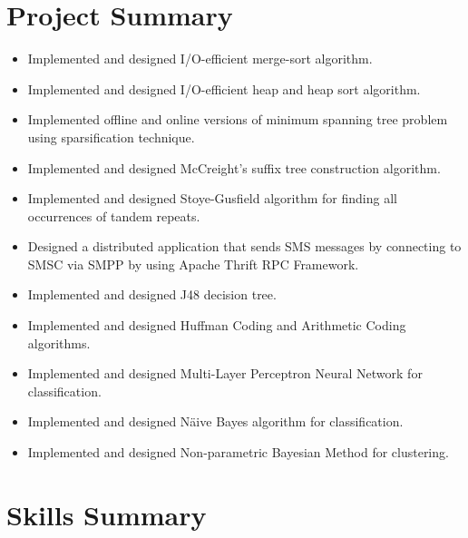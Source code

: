 \documentclass[showupdate]{xqcv}
\begin{document}
\section{Project Summary}
\begin{itemize}
  \item \footnotesize{Implemented and designed I/O-efficient merge-sort algorithm.}
  \item \footnotesize{Implemented and designed I/O-efficient heap and heap sort algorithm.}
  \item \footnotesize{Implemented offline and online versions of minimum spanning tree problem using sparsification technique.}
  \item \footnotesize{Implemented and designed McCreight's suffix tree construction algorithm.}
  \item \footnotesize{Implemented and designed Stoye-Gusfield algorithm for finding all occurrences of tandem repeats.}
  \item \footnotesize{Designed a distributed application that sends SMS messages by connecting to SMSC via SMPP by using Apache Thrift RPC Framework.}
  \item \footnotesize{Implemented and designed J48 decision tree.}
  \item \footnotesize{Implemented and designed Huffman Coding and Arithmetic Coding algorithms.}
  \item \footnotesize{Implemented and designed Multi-Layer Perceptron Neural Network for classification.}
  \item \footnotesize{Implemented and designed N\"{a}ive Bayes algorithm for classification.}
  \item \footnotesize{Implemented and designed Non-parametric Bayesian Method for clustering.}
\end{itemize}

\section{Skills Summary}
\begin{entrylist}
   \\                       
\end{entrylist}
\end{document}
